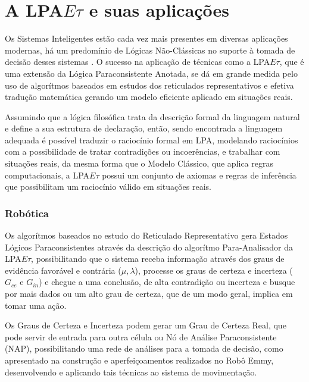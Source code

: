


\section{A LPA$E\tau$ e suas aplicações}

Os Sistemas Inteligentes estão cada vez mais presentes em diversas
aplicações modernas, há um predomínio de
Lógicas Não-Clássicas no suporte à tomada de decisão desses sistemas \cite{JISF2011}. O sucesso na aplicação de técnicas como a LPA$E\tau$, que é uma extensão da Lógica Paraconsistente Anotada, se dá em grande medida pelo uso de algorítmos baseados em estudos dos reticulados representativos e efetiva tradução matemática gerando um modelo eficiente aplicado em situações reais.

Assumindo que a lógica filosófica trata da descrição formal da linguagem natural e define a sua estrutura de declaração, então, sendo encontrada a linguagem adequada é possível traduzir o raciocínio formal em LPA, modelando raciocínios com a possibilidade de tratar contradições ou incoerências, e trabalhar com situações reais, da mesma forma que o Modelo Clássico, que aplica regras computacionais, a LPA$E\tau$ possui um conjunto de axiomas e regras de inferência que possibilitam um raciocínio válido em situações reais.


\subsubsection{Robótica}

Os algorítmos baseados no estudo do Reticulado Representativo gera Estados Lógicos Paraconsistentes através da descrição do algorítmo Para-Analisador da LPA$E\tau$, possibilitando que o sistema receba informação através dos graus de evidência favorável e contrária ($\mu, \lambda$), processe os graus de certeza e incerteza ($G_{ce}$ e $G_{in}$) e chegue a uma conclusão, de alta contradição ou incerteza e busque por mais dados ou um alto grau de certeza, que de um modo geral, implica em tomar uma ação. 

Os Graus de Certeza e Incerteza podem gerar um Grau de Certeza Real, que pode servir de entrada para outra célula ou Nó de Análise Paraconsistente (NAP), possibilitando uma rede de análises para a tomada de decisão, como apresentado na construção e aperfeiçoamentos realizados no Robô Emmy, \cite{JoaoInacio}\cite{ClaudioRodrigoTorres} desenvolvendo e aplicando tais técnicas ao sistema de movimentação.


